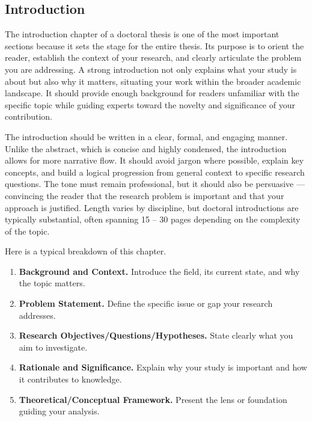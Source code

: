 \documentclass[PCOM,Thesis,Review]{mpThesis}
\newcommand{\Hd}[1]{{\color{SteelBlue}\bf#1.}}
\begin{document}
\begin{MainMatter}
\chapter{Introduction}
\label{ch:introduction}
\minitoc

\begin{Remark}
The introduction chapter of a doctoral thesis is one of the most important sections because it sets the stage for the entire thesis.
Its purpose is to orient the reader, establish the context of your research, and clearly articulate the problem you are addressing.
A strong introduction not only explains what your study is about but also why it matters, situating your work within the broader academic landscape.
It should provide enough background for readers unfamiliar with the specific topic while guiding experts toward the novelty and significance of your contribution.

The introduction should be written in a clear, formal, and engaging manner.
Unlike the abstract, which is concise and highly condensed, the introduction allows for more narrative flow.
It should avoid jargon where possible, explain key concepts, and build a logical progression from general context to specific research questions.
The tone must remain professional, but it should also be persuasive ---
convincing the reader that the research problem is important and that your approach is justified.
Length varies by discipline, but doctoral introductions are typically substantial, often spanning 15 -- 30 pages depending on the complexity of the topic.

Here is a typical breakdown of this chapter.
\begin{enumerate}
\item \Hd{Background and Context}
Introduce the field, its current state, and why the topic matters.

\item \Hd{Problem Statement}
Define the specific issue or gap your research addresses.

\item \Hd{Research Objectives/Questions/Hypotheses}
State clearly what you aim to investigate.

\item \Hd{Rationale and Significance}
Explain why your study is important and how it contributes to knowledge.

\item \Hd{Theoretical/Conceptual Framework}
Present the lens or foundation guiding your analysis.


\end{enumerate}
\end{Remark}
\end{MainMatter}
\end{document}
